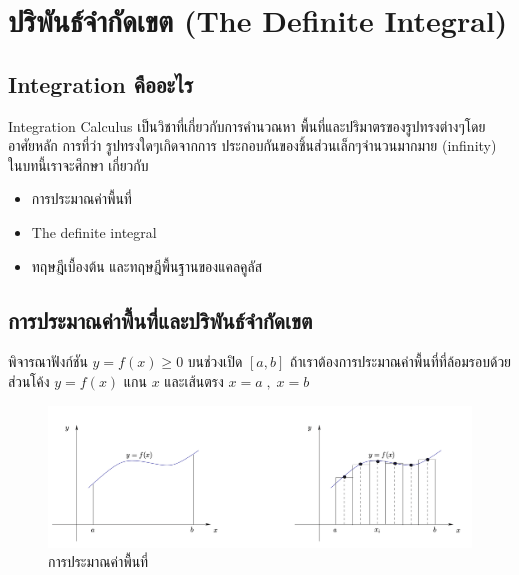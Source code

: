 \documentclass[
]{book}
\theoremstyle{definition}
\theoremstyle{definition}
\theoremstyle{definition}
\theoremstyle{definition}
\theoremstyle{remark}
\begin{document}
\section{ปริพันธ์จำกัดเขต (The Definite Integral)}\label{uxe1buxe23uxe1euxe19uxe18uxe08uxe33uxe01uxe14uxe40uxe02uxe15-the-definite-integral}

\subsection{Integration คืออะไร}\label{integration-uxe04uxe2duxe2duxe30uxe44uxe23}

Integration Calculus เป็นวิชาที่เกี่ยวกับการคำนวณหา
พื้นที่และปริมาตรของรูปทรงต่างๆโดยอาศัยหลัก การที่ว่า รูปทรงใดๆเกิดจากการ
ประกอบกันของชิ้นส่วนเล็กๆจำนวนมากมาย (infinity) ในบทนี้เราจะศึกษา เกี่ยวกับ

\begin{itemize}
\item
  การประมาณค่าพื้นที่
\item
  The definite integral
\item
  ทฤษฎีเบื้องต้น และทฤษฎีพื้นฐานของแคลคูลัส
\end{itemize}

\subsection{การประมาณค่าพื้นที่และปริพันธ์จำกัดเขต}\label{uxe01uxe32uxe23uxe1buxe23uxe30uxe21uxe32uxe13uxe04uxe32uxe1euxe19uxe17uxe41uxe25uxe30uxe1buxe23uxe1euxe19uxe18uxe08uxe33uxe01uxe14uxe40uxe02uxe15}

พิจารณาฟังก์ชัน \(y=f(x) \ge 0\) บนช่วงเปิด \([a,b]\)
ถ้าเราต้องการประมาณค่าพื้นที่ที่ล้อมรอบด้วยส่วนโค้ง \(y=f(x)\) แกน \(x\) และเส้นตรง
\(x=a\;,\;x=b\)\\

\begin{figure}
\includegraphics[width=1\linewidth]{images/fig-area-1} \caption{การประมาณค่าพื้นที่}\label{fig:fig-area-1}
\end{figure}
\end{document}

